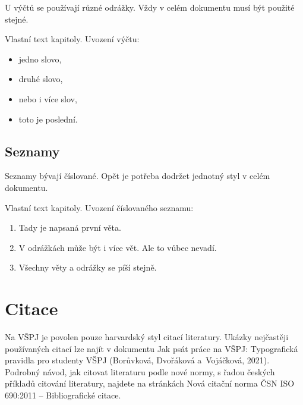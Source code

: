 {\color{infoBlue}
U výčtů se používají různé odrážky. Vždy v celém dokumentu musí být použité stejné.
}

Vlastní text kapitoly. Uvození výčtu:
\begin{itemize}
    \item jedno slovo,
    \item druhé slovo,
    \item nebo i více slov,
    \item toto je poslední.
\end{itemize}

\subsection{Seznamy}

{\color{infoBlue}
Seznamy bývají číslované. Opět je potřeba dodržet jednotný styl v celém dokumentu.
}

Vlastní text kapitoly. Uvození číslovaného seznamu:
\begin{enumerate}
    \item Tady je napsaná první věta.
    \item V odrážkách může být i více vět. Ale to vůbec nevadí.
    \item Všechny věty a odrážky se píší stejně.
\end{enumerate}

\section{Citace}

{\color{infoBlue}
Na VŠPJ je povolen pouze harvardský styl citací literatury. Ukázky nejčastěji používaných citací lze najít v dokumentu Jak psát práce na VŠPJ: Typografická pravidla pro studenty VŠPJ (Borůvková, Dvořáková a~Vojáčková, 2021). Podrobný návod, jak citovat literaturu podle nové normy, s řadou českých příkladů citování literatury, najdete na stránkách Nová citační norma ČSN ISO 690:2011 – Bibliografické citace.
}

\pagebreak
